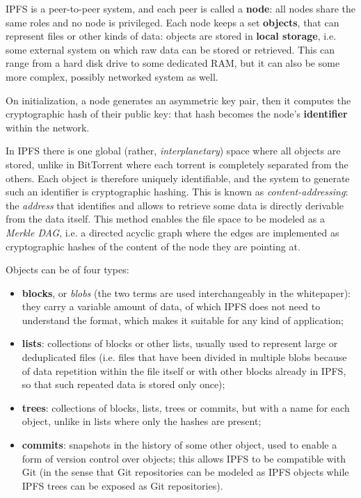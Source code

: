 \documentclass[mscthesis]{usiinfthesis}
\begin{document}
IPFS is a peer-to-peer system, and each peer is called a \textbf{node}: all nodes share the same roles and no node is privileged. Each node keeps a set \textbf{objects}, that can represent files or other kinds of data: objects are stored in \textbf{local storage}, i.e. some external system on which raw data can be stored or retrieved. This can range from a hard disk drive to some dedicated RAM, but it can also be some more complex, possibly networked system as well.

On initialization, a node generates an asymmetric key pair, then it computes the cryptographic hash of their public key: that hash becomes the node's \textbf{identifier} within the network.

In IPFS there is one global (rather, \textit{interplanetary}) space where all objects are stored, unlike in BitTorrent where each torrent is completely separated from the others. Each object is therefore uniquely identifiable, and the system to generate such an identifier is cryptographic hashing. This is known as \textit{content-addressing}: the \textit{address} that identifies and allows to retrieve some data is directly derivable from the data itself. This method enables the file space to be modeled as a \textit{Merkle DAG}, i.e. a directed acyclic graph where the edges are implemented as cryptographic hashes of the content of the node they are pointing at.

Objects can be of four types:
\begin{itemize}
	\item \textbf{blocks}, or \textit{blobs} (the two terms are used interchangeably in the whitepaper): they carry a variable amount of data, of which IPFS does not need to understand the format, which makes it suitable for any kind of application;
	\item \textbf{lists}: collections of blocks or other lists, usually used to represent large or deduplicated files (i.e. files that have been divided in multiple blobs because of data repetition within the file itself or with other blocks already in IPFS, so that such repeated data is stored only once);
	\item \textbf{trees}: collections of blocks, lists, trees or commits, but with a name for each object, unlike in lists where only the hashes are present;
	\item \textbf{commits}: snapshots in the history of some other object, used to enable a form of version control over objects; %
	this allows IPFS to be compatible with Git (in the sense that Git repositories can be modeled as IPFS objects while IPFS trees can be exposed as Git repositories).
\end{itemize}
\end{document}
